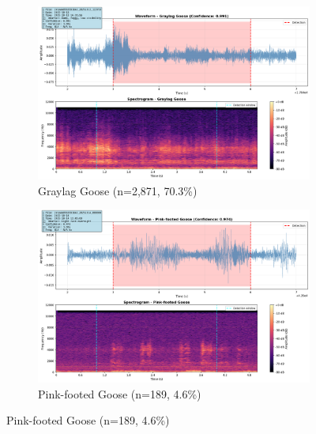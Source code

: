 \documentclass[twocolumn]{article}
\begin{document}
\begin{figure}[t]
\centering
\begin{subfigure}{0.47\textwidth}
\centering
\includegraphics[width=\textwidth]{figures/spectrogram_graylag_goose.png}
\caption{Graylag Goose (n=2,871, 70.3\%)}
\end{subfigure}
\hfill
\begin{subfigure}{0.47\textwidth}
\centering
\includegraphics[width=\textwidth]{figures/spectrogram_pink-footed_goose.png}
\caption{Pink-footed Goose (n=189, 4.6\%)}
\end{subfigure}

\vspace{0.3cm}


\end{figure}
\end{document}
